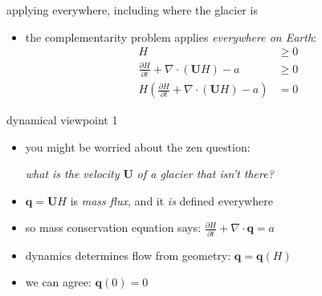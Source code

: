 \documentclass[10pt,hyperref,dvipsnames]{beamer}
\newcommand{\bq}{\mathbf{q}}
\newcommand{\bU}{\mathbf{U}}
\newcommand{\Div}{\nabla\cdot}
\begin{document}
\begin{frame}{applying everywhere, including where the glacier is}
\begin{itemize}
\item the complementarity problem applies \emph{everywhere on Earth}:
\begin{align*}
H &\ge 0 \\
\frac{\partial H}{\partial t} + \Div \left(\bU H\right) - a &\ge 0 \\
H \left(\frac{\partial H}{\partial t} + \Div \left(\bU H\right) - a\right) &= 0
\end{align*}
\end{itemize}
\end{frame}


\begin{frame}{dynamical viewpoint 1}
\begin{itemize}
\item you might be worried about the zen question:

\emph{what is the velocity $\bU$ of a glacier that isn't there?}
\item $\bq = \bU H$ is \emph{mass flux}, and it \emph{is} defined everywhere
\item so mass conservation equation says: $\frac{\partial H}{\partial t} + \Div \bq = a$
\item dynamics determines flow from geometry: $\bq=\bq(H)$
\item we can agree: $\bq(0)=0$
\end{itemize}
\end{frame}
\end{document}

